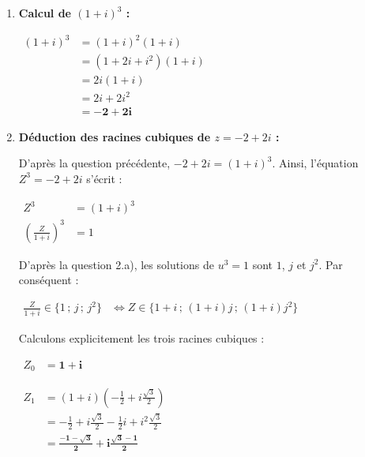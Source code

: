 \documentclass[12pt,a4paper]{article}
\begin{document}
\begin{enumerate}
\begin{enumerate}
        D'où $\mathcal{S} = \left\{\mathbf{1 \,;\, -\dfrac{1}{2} + i\dfrac{\sqrt{3}}{2} \,;\, -\dfrac{1}{2} - i\dfrac{\sqrt{3}}{2}}\right\}$.

        \item \textbf{Calcul de $(1 + i)^3$ :}
        
        $
        \begin{aligned}
            (1 + i)^3 &= (1 + i)^2 (1 + i)\\
            &= (1 + 2i + i^2)(1 + i)\\
            &= 2i(1 + i)\\
            &= 2i + 2i^2\\
            &= \mathbf{-2 + 2i}
        \end{aligned}
        $

        \item \textbf{Déduction des racines cubiques de $z = -2 + 2i$ :}
        
        D'après la question précédente, $-2 + 2i = (1 + i)^3$. Ainsi, l'équation $Z^3 = -2 + 2i$ s'écrit :
        
        $
        \begin{aligned}
            Z^3 &= (1 + i)^3\\
            \left(\frac{Z}{1 + i}\right)^3 &= 1
        \end{aligned}
        $
        
        D'après la question 2.a), les solutions de $u^3 = 1$ sont $1$, $j$ et $j^2$. Par conséquent :
        
        $
        \begin{aligned}
            \frac{Z}{1 + i} \in \{1 \,;\, j \,;\, j^2\} &\iff Z \in \{1 + i \,;\, (1 + i)j \,;\, (1 + i)j^2\}
        \end{aligned}
        $
        
        Calculons explicitement les trois racines cubiques :
        
        $
        \begin{aligned}
            Z_0 &= \mathbf{1 + i}
        \end{aligned}
        $
        
        $
        \begin{aligned}
            Z_1 &= (1 + i)\left(-\frac{1}{2} + i\frac{\sqrt{3}}{2}\right)\\
            &= -\frac{1}{2} + i\frac{\sqrt{3}}{2} - \frac{1}{2}i + i^2\frac{\sqrt{3}}{2}\\
            &= \mathbf{\frac{-1 - \sqrt{3}}{2} + i\frac{\sqrt{3} - 1}{2}}
        \end{aligned}
        $
        

\end{enumerate}
\end{enumerate}
\end{document}
